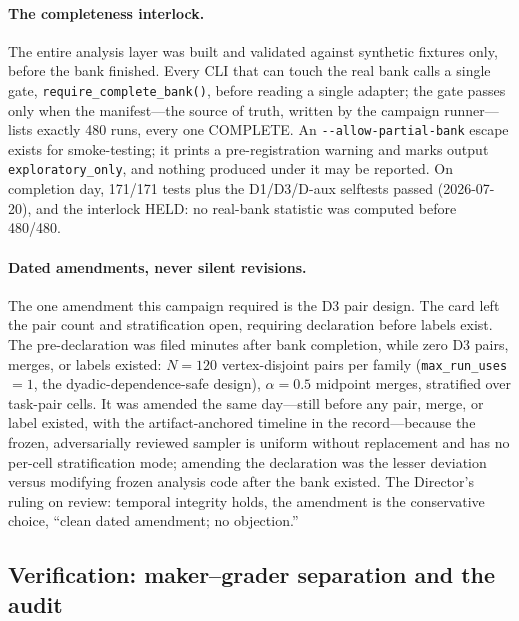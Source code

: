 \documentclass[10pt]{article}
\begin{document}
\paragraph{The completeness interlock.} The entire analysis layer was built
and validated against synthetic fixtures only, before the bank finished.
Every CLI that can touch the real bank calls a single gate,
\texttt{require\_complete\_bank()}, before reading a single adapter; the
gate passes only when the manifest---the source of truth, written by the
campaign runner---lists exactly 480 runs, every one COMPLETE. An
\texttt{-{}-allow-partial-bank} escape exists for smoke-testing; it prints
a pre-registration warning and marks output \texttt{exploratory\_only},
and nothing produced under it may be reported. On completion day, 171/171
tests plus the D1/D3/D-aux selftests passed (2026-07-20), and the interlock
HELD: no real-bank statistic was computed before 480/480.

\paragraph{Dated amendments, never silent revisions.} The one amendment
this campaign required is the D3 pair design. The card left the pair count
and stratification open, requiring declaration before labels exist. The
pre-declaration was filed minutes after bank completion, while zero D3
pairs, merges, or labels existed: $N = 120$ vertex-disjoint pairs per
family (\texttt{max\_run\_uses} $= 1$, the dyadic-dependence-safe design),
$\alpha = 0.5$ midpoint merges, stratified over task-pair cells. It was
amended the same day---still before any pair, merge, or label existed,
with the artifact-anchored timeline in the record---because the frozen,
adversarially reviewed sampler is uniform without replacement and has no
per-cell stratification mode; amending the declaration was the lesser
deviation versus modifying frozen analysis code after the bank existed.
The Director's ruling on review: temporal integrity holds, the amendment
is the conservative choice, ``clean dated amendment; no objection.''

\subsection{Verification: maker--grader separation and the audit}
\label{sec:verification}
\end{document}
